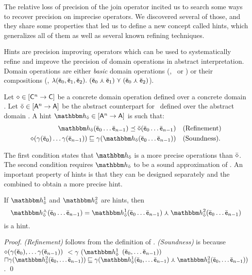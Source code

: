\documentclass[sttt]{svjour}
\begin{document}
The relative loss of precision of the join operator incited us to search some ways to recover precision on imprecise operators.
We discovered several of those, and they share some properties that led us to define a new concept called hints, which generalizes all of them as well as several known refining techniques.

Hints are precision improving operators which can be used
to systematically refine and improve the precision of domain
operations in abstract interpretation.
Domain operations are either  \emph{basic} domain operations (\eg, \cjoin\
or \cmeet)
or their compositions (\eg, $\lambda (\bar{\mathsf{\mathsf{e}}}_0, \bar{\mathsf{\mathsf{e}}}_1,
\bar{\mathsf{\mathsf{e}}}_2).\ (\bar{\mathsf{\mathsf{e}}}_0 \curlywedge \bar{\mathsf{\mathsf{e}}}_1) \curlyvee  (\bar{\mathsf{\mathsf{e}}}_0 \curlywedge \bar{\mathsf{\mathsf{e}}}_2)$).

\begin{definition}
\label{def:hints}
Let $\diamond \in [\mathsf{C}^n \rightarrow\mathsf{C}]$ be a concrete domain operation defined over a concrete domain .
Let $\bar{\mathsf{\mathsf{\diamond}}} \in [{\mathsf{A}}^n \rightarrow{\mathsf{A}}]$ be the abstract counterpart for \op\ defined over the abstract domain  .
A hint $\hint{\ael{\op}}\in \funzione{\adom{A}^n}{\adom{A}}$ is  such that:
\[
\begin{aligned}
\hint{\ael{\op}}(\ael{e}_0 \dots \ael{e}_{n-1}) \cless \ael{\op}(\ael{e}_0 \dots \ael{e}_{n-1}) & \quad \text{\textrm{(Refinement)}}  \\
\op(\gamma( \ael{e}_0) \dots \gamma(\ael{e}_{n-1})) \less \gamma(\hint{\ael{\op}}(\ael{e}_0 \dots \ael{e}_{n-1})) & \quad \text(\textrm{Soundness}).
\end{aligned}
\]
\end{definition}
The first condition states that $\hint{\ael{\op}}$ is a more precise operations than $\bar{\mathsf{\mathsf{\diamond}}}$.
The second condition requires $\hint{\ael{\op}}$ to be a sound approximation of \op.
An important property of hints is that they can be designed separately and the combined to obtain a more precise hint.
\begin{lemma}
If $\hint{\ael{\op}}^1$ and $\hint{\ael{\op}}^2$ are hints, then 
\[
\hint{\ael{\op}}^\cmeet(\ael{e}_0 \dots \ael{e}_{n-1}) = \hint{\ael{\op}}^1(\ael{e}_0 \dots \ael{e}_{n-1}) \cmeet \hint{\ael{\op}}^2(\ael{e}_0 \dots \ael{e}_{n-1})\]
is a hint.
\end{lemma}
\textit{Proof.}
\textit{(Refinement)} follows  from the definition of \cmeet.
\textit{(Soundness)} is because $\diamond(\gamma( \bar{\mathsf{\mathsf{e}}}_0), \dots \gamma(\bar{\mathsf{\mathsf{e}}}_{n-1}))$ $\less \gamma$ $(\hint{\ael{\op}}^1$ \allowbreak $(\bar{\mathsf{\mathsf{e}}}_0, \dots \bar{\mathsf{\mathsf{e}}}_{n-1}))$ $\meet  \gamma(\hint{\ael{\op}}^2(\ael{e}_0, \dots \ael{e}_{n-1})) \less  \gamma(\hint{\ael{\op}}^1(\ael{e}_0, \dots \ael{e}_{n-1}) \cmeet \hint{\ael{\op}}^2(\ael{e}_0, \dots \ael{e}_{n-1}))$.
\qed
\end{document}
